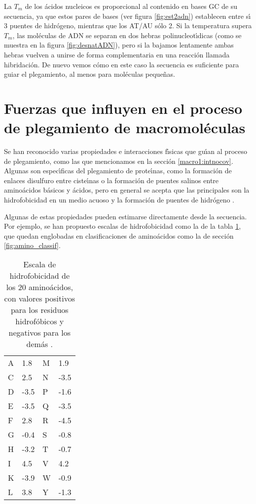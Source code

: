 La $T_{m}$ de los \'{a}cidos nucleicos es proporcional al contenido en bases GC de su secuencia, 
ya que estos pares de bases (ver figura \ref{fig:est2adn}) establecen entre s\'\i{} 3 puentes de hidr\'{o}geno, 
mientras que los AT/AU s\'{o}lo 2. Si la temperatura supera $T_{m}$, las mol\'{e}culas de ADN se separan 
en dos hebras polinucleot\'\i{}dicas (como se muestra en la figura \ref{fig:desnatADN}), pero si la 
bajamos lentamente ambas hebras vuelven a unirse de forma complementaria en una reacci\'{o}n llamada 
hibridaci\'{o}n. De nuevo vemos c\'{o}mo en este caso la secuencia es suficiente para guiar el plegamiento, 
al menos para mol\'{e}culas peque\~nas.\\

\section{Fuerzas que influyen en el proceso de plegamiento de macromol\'{e}culas}

Se han reconocido varias propiedades e interacciones f\'\i{}sicas que gu\'\i{}an al proceso de plegamiento, 
como las que mencionamos en la secci\'{o}n \ref{macro1:intnocov}. Algunas son espec\'\i{}ficas
del plegamiento de prote\'\i{}nas, como la formaci\'{o}n de enlaces disulfuro entre ciste\'\i{}nas o la formaci\'{o}n
de puentes salinos entre amino\'{a}cidos b\'{a}sicos y \'{a}cidos, pero en general se acepta que las principales
son la hidrofobicidad en un medio acuoso y la formaci\'{o}n de puentes de hidr\'{o}geno 
\citep{Dill1990,Lehninger1982,Mathews1999}.

Algunas de estas propiedades pueden estimarse directamente desde la secuencia. Por ejemplo, se han
propuesto escalas de hidrofobicidad como la de la tabla \ref{tab:hidrof}, 
que quedan englobadas en clasificaciones de amino\'{a}cidos como la de secci\'{o}n \ref{fig:amino_classif}.

\begin{table}[h]
\begin{center}
\begin{scriptsize}
\begin{tabular}{|l|l|l|l|}\hline
A & 1.8 & M & 1.9\\   
C & 2.5 & N & -3.5\\
D & -3.5 & P & -1.6\\ 
E & -3.5 & Q & -3.5\\  
F & 2.8 & R & -4.5\\
G & -0.4 & S & -0.8\\      
H & -3.2 & T & -0.7\\    
I & 4.5 & V & 4.2\\   
K & -3.9 & W & -0.9\\
L & 3.8 & Y & -1.3\\
\end{tabular}
\end{scriptsize}
\end{center}
\caption%
{Escala de hidrofobicidad de los 20 amino\'{a}cidos, con valores positivos para los residuos hidrof\'{o}bicos
y negativos para los dem\'{a}s \citep{Kyte1982}.}
\label{tab:hidrof}
\end{table} 

